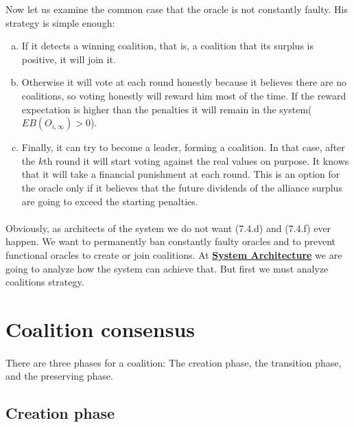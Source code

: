 \documentclass{article}
\begin{document}
\par Now let us examine the common case that the oracle is not constantly faulty. His strategy is simple enough: 
\begin{enumerate}[(a),start=4]
\item If it detects a winning coalition, that is, a coalition that its surplus is positive, it will join it. 
\item Otherwise it will vote at each round honestly  because it believes there are no coalitions, so voting honestly will reward him most of the time. If the reward expectation is higher than the penalties it will remain in the system($EB(O_{i,\infty})>0$).
\item Finally, it can try to become a leader, forming a coalition. In that case, after the  $k$th round it will start voting against the real values on purpose. It knows that it will take a financial punishment at each round. This is an option for the oracle only if it believes that the future dividends of the alliance surplus are going to exceed the starting penalties. 
\end{enumerate}
\paragraph{ }
Obviously, as architects of the system we do not want (7.4.d) and (7.4.f) ever happen. We want to permanently ban constantly faulty oracles and to prevent functional oracles to create or join coalitions. At \hyperref[sec:sa]{\textbf{System Architecture}} we are going to analyze how the system can achieve that. But first we must analyze coalitions strategy.

\section{Coalition consensus}
\label{sec:cc}
\paragraph{ }

\paragraph{ }
There are three phases for a coalition: The creation phase, the transition phase, and the preserving phase.

\subsection{Creation phase}
\end{document}
